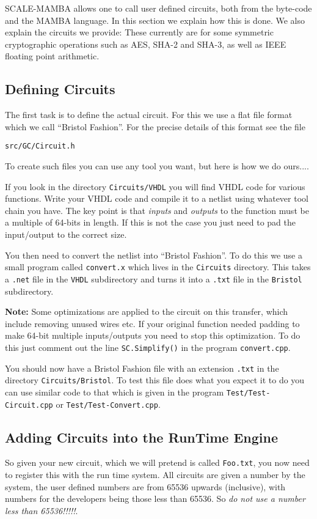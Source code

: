 \label{sec:GC}
SCALE-MAMBA allows one to call user defined circuits, both
from the byte-code and the MAMBA language.
In this section we explain how this is done.
We also explain the circuits we provide: These currently
are for some symmetric cryptographic operations such as
AES, SHA-2 and SHA-3, as well as IEEE floating point
arithmetic.


\subsection{Defining Circuits}
The first task is to define the actual circuit.
For this we use a flat file format which we call 
``Bristol Fashion''.
For the precise details of this format see the
file 
\begin{center}
\verb|src/GC/Circuit.h|
\end{center}
To create such files you can use any tool you want,
but here is how we do ours....

If you look in the directory \verb|Circuits/VHDL| you
will find VHDL code for various functions. Write your
VHDL code and compile it to a netlist using whatever
tool chain you have.
The key point is that {\em inputs} and {\em outputs}
to the function must be a multiple of 64-bits in length.
If this is not the case you just need to pad the
input/output to the correct size.

You then need to convert the netlist into ``Bristol 
Fashion''. To do this we use a small program
called \verb|convert.x| which lives in the 
\verb|Circuits| directory. This takes a \verb|.net|
file in the \verb|VHDL| subdirectory and turns it
into a \verb|.txt| file in the \verb|Bristol| subdirectory.

{\bf Note:} Some optimizations are applied to the
circuit on this transfer, which include removing unused
wires etc. If your original function needed padding to
make 64-bit multiple inputs/outputs you need to stop
this optimization. To do this just comment out the
line \verb|SC.Simplify()| in the program \verb|convert.cpp|.

You should now have a Bristol Fashion file with an 
extension \verb|.txt| in the directory \verb|Circuits/Bristol|.
To test this file does what you expect it to do you
can use similar code to that which is given in the
program \verb|Test/Test-Circuit.cpp| or
\verb|Test/Test-Convert.cpp|.

\subsection{Adding Circuits into the RunTime Engine}
So given your new circuit, which we will pretend is
called \verb|Foo.txt|, you now need to register this
with the run time system.
All circuits are given a number by the system,
the user defined numbers are from 65536 upwards (inclusive),
with numbers for the developers being those less
than 65536.
So {\em do not use a number less than 65536!!!!!}.

